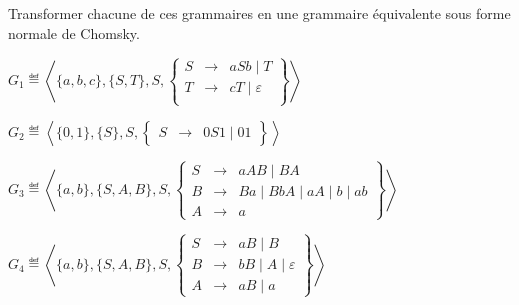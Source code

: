 
\begingroup

\begin{exercice}\label{exo:parsing/decision/FNC}

  Transformer chacune de ces grammaires en une grammaire équivalente
  sous forme normale de Chomsky.
  \begin{questions}
  \item $G_1  \eqdef \left\langle\{a, b, c\}, \{S, T\}, S,
    \left\{\begin{array}{lll}
    S   &\rightarrow& aSb \mid  T \\
    T   &\rightarrow& cT \mid  \varepsilon \\
    \end{array}\right\}\right\rangle$
  \item $G_2 \eqdef \left\langle \{0, 1\}, \{S\}, S,
    \left\{\begin{array}{lll}
    S   &\rightarrow& 0 S 1 \mid  0 1
    \end{array}\right\}\right\rangle$
  \item $G_3 \eqdef \left\langle\{a, b\}, \{S, A, B\}, S,
    \left\{\begin{array}{lll}
    S   &\rightarrow& aAB \mid  BA \\
    B   &\rightarrow& Ba \mid  BbA \mid  aA \mid  b \mid  ab\\
    A   &\rightarrow& a
    \end{array}\right\}\right\rangle$
  \item $G_4 \eqdef \left\langle \{a,b\}, \{S, A, B\}, S,
    \left\{\begin{array}{lll}
    S   &\rightarrow& aB \mid  B \\
    B   &\rightarrow& bB \mid  A \mid  \varepsilon \\
    A   &\rightarrow& aB \mid  a
    \end{array}\right\} \right\rangle$
  \end{questions}

\end{exercice}


